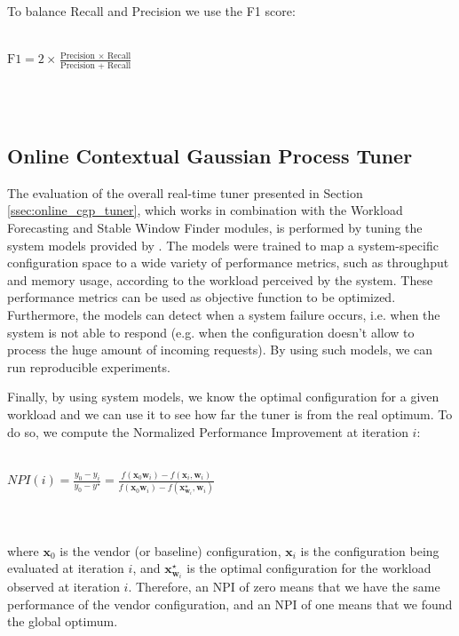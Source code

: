 \documentclass[a4paper, 12pt]{article} %
\begin{document}
	To balance Recall and Precision we use the F1 score:\\\\
	\centerline{
		$
		\text{F1} = 2 \times \frac{ \text{Precision } \times \text{ Recall}}{\text{Precision } + \text{ Recall}}
		$
	}\\\\
	
	\subsection{Online Contextual Gaussian Process Tuner } \label{ssec:exp_online_cgp}
	The evaluation of the overall real-time tuner presented in Section \ref{ssec:online_cgp_tuner}, which works in combination with the Workload Forecasting and Stable Window Finder modules, is performed by tuning the system models provided by \cite{AkamasCGP}. The models were trained to map a system-specific configuration space to a wide variety of performance metrics, such as throughput and memory usage, according to the workload perceived by the system. These performance metrics can be used as objective function to be optimized. Furthermore, the models can detect when a system failure occurs, i.e. when the system is not able to respond (e.g. when the configuration doesn't allow to process the huge amount of incoming requests). By using such models, we can run reproducible experiments.
	
	Finally, by using system models, we know the optimal configuration for a given workload and we can use it to see how far the tuner is from the real optimum. To do so, we compute the Normalized Performance Improvement at iteration $i$:\\\\
	\centerline{
	$
	NPI(i) = \frac{y_0 - y_i}{y_0 - y^\star} = \frac{f(\pmb{x}_0 \pmb{w}_i) - f(\pmb{x}_i, \pmb{w}_i)}{f(\pmb{x}_0 \pmb{w}_i) - f(\pmb{x}_{\pmb{w}_i}^\star, \pmb{w}_i)}
	$
	}\\\\
	where $\pmb{x}_0$ is the vendor (or baseline) configuration, $\pmb{x}_i$ is the configuration being evaluated at iteration $i$, and $\pmb{x}_{\pmb{w}_i}^\star$ is the optimal configuration for the workload observed at iteration $i$. Therefore, an NPI of zero means that we have the same performance of the vendor configuration, and an NPI of one means that we found the global optimum. 
	
\end{document}
